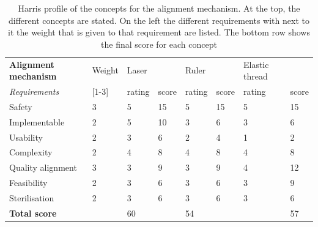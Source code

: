 \documentclass[whitelogo]{tudelft-report}
\begin{document}
{{{%
\begin{table}[t!]
	\begin{tabular}{|ll|ll|ll|ll|}
		\hline
		\multicolumn{1}{|l|}{\textbf{Alignment mechanism}}     & Weight    & Laser                       &       & Ruler                       &       & Elastic thread              &       \\ \cline{1-1}
		\multicolumn{1}{|l|}{\textit{Requirements}} & {[}1-3{]} & \multicolumn{1}{l|}{rating} & score & \multicolumn{1}{l|}{rating} & score & \multicolumn{1}{l|}{rating} & score \\ \hline
		\multicolumn{1}{|l|}{Safety}                & 3         & \multicolumn{1}{l|}{5}      & 15    & \multicolumn{1}{l|}{5}      & 15    & \multicolumn{1}{l|}{5}      & 15    \\ \hline
		\multicolumn{1}{|l|}{Implementable}         & 2         & \multicolumn{1}{l|}{5}      & 10    & \multicolumn{1}{l|}{3}      & 6     & \multicolumn{1}{l|}{3}      & 6     \\ \hline
		\multicolumn{1}{|l|}{Usability}             & 2         & \multicolumn{1}{l|}{3}      & 6     & \multicolumn{1}{l|}{2}      & 4     & \multicolumn{1}{l|}{1}      & 2     \\ \hline
		\multicolumn{1}{|l|}{Complexity}            & 2         & \multicolumn{1}{l|}{4}      & 8     & \multicolumn{1}{l|}{4}      & 8     & \multicolumn{1}{l|}{4}      & 8     \\ \hline
		\multicolumn{1}{|l|}{Quality alignment}     & 3         & \multicolumn{1}{l|}{3}      & 9     & \multicolumn{1}{l|}{3}      & 9     & \multicolumn{1}{l|}{4}      & 12    \\ \hline
		\multicolumn{1}{|l|}{Feasibility}           & 2         & \multicolumn{1}{l|}{3}      & 6     & \multicolumn{1}{l|}{3}      & 6     & \multicolumn{1}{l|}{3}      & 9     \\ \hline
		\multicolumn{1}{|l|}{Sterilisation}         & 2         & \multicolumn{1}{l|}{3}      & 6     & \multicolumn{1}{l|}{3}      & 6     & \multicolumn{1}{l|}{3}      & 6     \\ \hline
		\textbf{Total score}                        &           &      60                       &       &         54                    &       &                             &     57  \\ \hline
	\end{tabular}
	\caption{Harris profile of the concepts for the alignment mechanism. At the top, the different concepts are stated. On the left the different requirements with next to it the weight that is given to that requirement are listed. The bottom row shows the final score for each concept}
	\label{table:draglift1}
\end{table}

}}}
\end{document}
